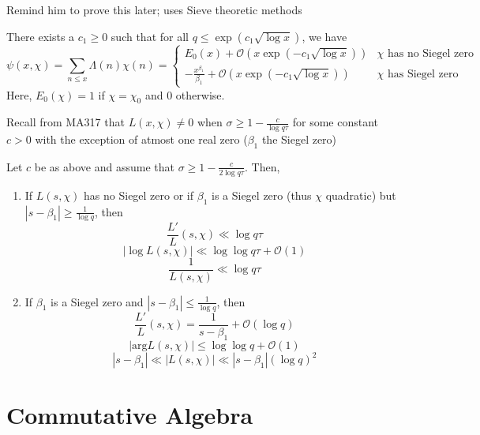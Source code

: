 \documentclass[oneside, 12pt, ]{scrbook}
\theoremstyle{theorem}
\begin{document}
\textcolor{BrickRed}{Remind him to prove this later; uses Sieve theoretic methods}

\begin{theorem}
There exists a $c_{1} \geq 0$ such that for all $q \le \exp (c_{1} \sqrt{\log x})$, we have $$\psi(x, \chi) = \sum_{n \le x}\Lambda (n) \chi (n) = \begin{cases} E_{0}(x) + \mathcal{O} (x\exp(-c_{1}\sqrt{\log x})) & \chi \text{ has no Siegel zero} \\ -\frac{x^{\beta_{1}}}{\beta_{1}} + \mathcal{O} (x\exp(-c_{1}\sqrt{\log x})) & \chi \text{ has Siegel zero} \end{cases}$$ Here, $E_{0}(\chi) = 1$ if $\chi = \chi_{0}$ and $0$ otherwise. 
\end{theorem}

Recall from MA317 that $L(x,\chi) \neq 0$ when $\sigma \geq  1 - \frac{c}{\log q\tau}$ for some constant $c>0$ with the exception of atmost one real zero ($\beta_{1}$ the Siegel zero)

\begin{proposition}
Let $c$ be as above and assume that $\sigma \geq 1 - \frac{c}{2 \log q \tau}$. Then, 
\begin{enumerate}
\item If $L(s,\chi)$ has no Siegel zero or if $\beta_{1}$ is a Siegel zero (thus $\chi$ quadratic) but $|s- \beta_{1}| \geq \frac{1}{\log q}$, then $$\frac{L'}{L}(s, \chi) \ll \log q \tau$$ $$|\log L(s,\chi)| \ll \log \log q\tau + \mathcal{O}(1)$$ $$\frac{1}{L(s,\chi)} \ll \log q\tau$$
\item If $\beta_{1}$ is a Siegel zero and $|s - \beta_{1}| \le \frac{1}{\log q}$, then $$\frac{L'}{L}(s, \chi) = \frac{1}{s- \beta_{1}} + \mathcal{O}(\log q)$$ $$|\mathrm{arg} L(s,\chi)| \le \log \log q + \mathcal{O}(1)$$ $$|s- \beta_{1}| \ll |L(s,\chi)| \ll |s-\beta_{1}|(\log q)^2$$
\end{enumerate}
\end{proposition}


















\part{Commutative Algebra}
\end{document}

